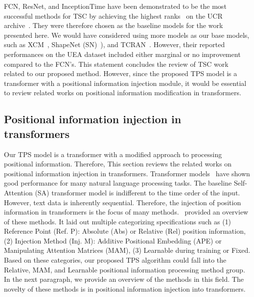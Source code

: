 \documentclass[journal]{IEEEtran}
\begin{document}
FCN, ResNet, and InceptionTime have been demonstrated to be the most successful methods for TSC by achieving the highest ranks~\cite{rank1, rank2} on the UCR archive~\cite{dau2019ucr}. They were therefore chosen as the baseline models for the work presented here. We would have considered using more models as our base models, such as XCM~\cite{xcm}, ShapeNet (SN)~\cite{shapenet}), and TCRAN~\cite{tcran}. However, their reported performances on the UEA dataset included either marginal or no improvement compared to the FCN’s. This statement concludes the review of TSC work related to our proposed method. However, since the proposed TPS model is a transformer with a positional information injection module, it would be essential to review related works on positional information modification in transformers.

\subsection{Positional information injection in transformers}
Our TPS model is a transformer with a modified approach to processing positional information. Therefore, This section reviews the related works on positional information injection in transformers. Transformer models~\cite{vaswani2017attention} have shown good performance for many natural language processing tasks. The baseline Self-Attention (SA) transformer model is indifferent to the time order of the input. However, text data is inherently sequential. Therefore, the injection of position information in transformers is the focus of many methods.~\cite{dufter_position_2022} provided an overview of these methods. It laid out multiple categorizing specifications such as (1) Reference Point (Ref. P): Absolute (Abs) or Relative (Rel) position information, (2) Injection Method (Inj. M): Additive Positional Embedding (APE) or Manipulating Attention Matrices (MAM), (3) Learnable during training or Fixed. Based on these categories, our proposed TPS algorithm could fall into the Relative, MAM, and Learnable positional information processing method group. In the next paragraph, we provide an overview of the methods in this field. The novelty of these methods is in positional information injection into transformers.
\end{document}

